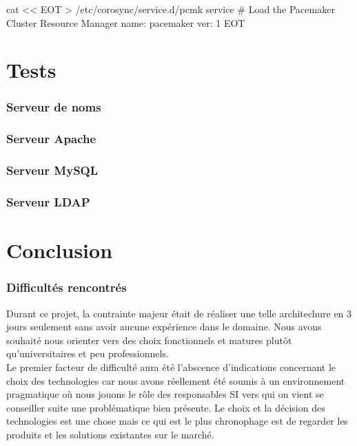 \documentclass[11pt,a4paper]{report}
\begin{document}
                \begin{bashcode}
                    cat << EOT > /etc/corosync/service.d/pcmk
                    service {
                            # Load the Pacemaker Cluster Resource Manager
                            name: pacemaker
                            ver:  1
                    }
                    EOT
                \end{bashcode}
                
            
    \part{Tests}
        \section{Serveur de noms}
        \section{Serveur Apache}
        \section{Serveur MySQL}
        \section{Serveur LDAP}
    \part{Conclusion}
        \section{Difficultés rencontrés}
            
            Durant ce projet, la contrainte majeur était de réaliser une telle architechure en 3 jours seulement sans avoir aucune expérience dans le domaine. Nous avons souhaité nous orienter vers des choix fonctionnels et matures plutôt qu'universitaires et peu professionnels.\\
            
            Le premier facteur de difficulté aura été l'abscence d'indications concernant le choix des technologies car nous avons réellement été soumis à un environnement pragmatique où nous jouons le rôle des responsables SI vers qui on vient se conseiller suite une problématique bien présente.
            Le choix et la décision des technologies est une chose mais ce qui est le plus chronophage est de regarder les produits et les solutions existantes sur le marché.\\
            
\end{document}
